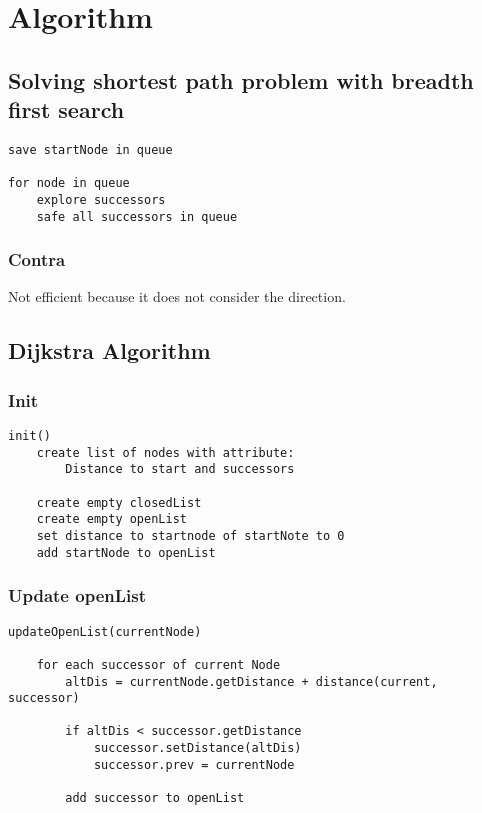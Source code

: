 \section{Algorithm}\label{sec:algorithm}

\subsection{Solving shortest path problem with breadth first search}
\label{subsec:solving-spp-with-breadth-first-search}

\begin{lstlisting}[caption=Solving shortest path problem with breadth first search, label=lst:sppWithBreadthFirstSearch]
save startNode in queue

for node in queue
    explore successors
    safe all successors in queue
\end{lstlisting}

\subsubsection*{Contra}
Not efficient because it does not consider the direction.

\subsection{Dijkstra Algorithm}\label{subsec:dijkstra-algorithm}

\subsubsection*{Init}
\begin{lstlisting}[caption=Dijkstra Algorithm - Init, label=lst:DijkstraAlgorithmInit]
init()
    create list of nodes with attribute:
        Distance to start and successors

    create empty closedList
    create empty openList
    set distance to startnode of startNote to 0
    add startNode to openList
\end{lstlisting}

\newpage

\subsubsection*{Update openList}
\begin{lstlisting}[caption=Dijkstra Algorithm - Update openList, label=lst:DijkstraAlgorithmUpdateOpenList]
updateOpenList(currentNode)

    for each successor of current Node
        altDis = currentNode.getDistance + distance(current, successor)

        if altDis < successor.getDistance
            successor.setDistance(altDis)
            successor.prev = currentNode

        add successor to openList
\end{lstlisting}

